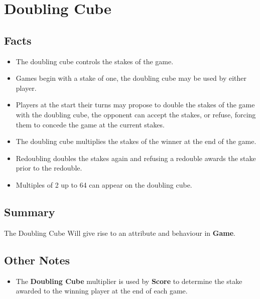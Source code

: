 \section{Doubling Cube}

\subsection{Facts}

\begin{itemize} [itemsep=2pt,parsep=2pt]
    \item The doubling cube controls the stakes of the game.
    \item Games begin with a stake of one, the doubling cube may be used by either player.
    \item Players at the start their turns may propose to double the stakes of the game
          with the doubling cube, the opponent can accept the stakes, or refuse, forcing them
          to concede the game at the current stakes.
    \item The doubling cube multiplies the stakes of the winner at the end of the game.
    \item Redoubling doubles the stakes again and refusing a redouble awards the stake prior to the             redouble.
    \item Multiples of 2 up to 64 can appear on the doubling cube.
\end{itemize}


\subsection{Summary}
The Doubling Cube Will give rise to an attribute and behaviour in \textbf{Game}.

\subsection{Other Notes}

\begin{itemize}
    \item The \textbf{Doubling Cube} multiplier is used by \textbf{Score} to determine the stake awarded to the winning player at the end of each game.
\end{itemize}


